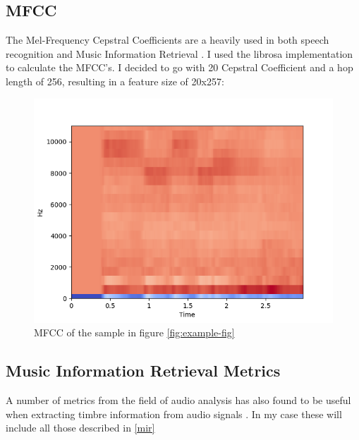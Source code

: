 \documentclass[a4paper, 12pt, twoside]{report}
\begin{document}
\subsection{MFCC}
\label{sec:org70aa9fd}

The Mel-Frequency Cepstral Coefficients are a heavily used in both speech recognition and Music Information Retrieval \cite{medium,klustr,Racharla_2020,article}.
I used the librosa implementation to calculate the MFCC's. I decided to go with 20 Cepstral Coefficient and a hop length of 256, resulting in a feature size of 20x257:

\begin{figure}[h!]
\centering
\includegraphics[width=.7\linewidth]{./Figures/mfcc.png}
\caption{\label{fig:mfcc}MFCC of the sample in figure \ref{fig:example-fig}}
\end{figure}

\subsection{Music Information Retrieval Metrics}
\label{sec:orgb3249b0}

A number of metrics from the field of audio analysis has also found to be useful when extracting timbre information from audio signals \cite{article,klustr}. In my case these will include all those described in \ref{mir}
\end{document}
